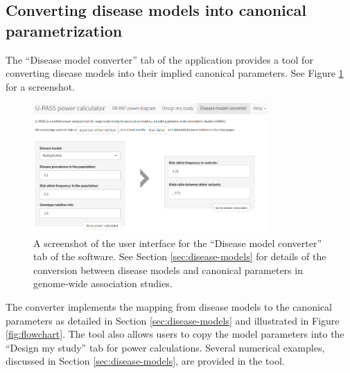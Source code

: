 \subsection{Converting disease models into canonical parametrization}

The ``Disease model converter'' tab of the application provides a tool for converting disease models into their implied canonical parameters.
See Figure \ref{fig:UPASS-model-converter} for a screenshot.

\begin{figure}
    \centering
    \includegraphics[width=0.8\textwidth]{figures/UPASS_model_converter.png}
    \caption{A screenshot of the user interface for the ``Disease model converter'' tab of the software. See Section \ref{sec:disease-models} for details of the conversion between disease models and canonical parameters in genome-wide association studies.}
    \label{fig:UPASS-model-converter}
\end{figure}

The converter implements the mapping from disease models to the canonical parameters as detailed in Section \ref{sec:disease-models} and  illustrated in Figure \ref{fig:flowchart}.
The tool also allows users to copy the model parameters into the ``Design my study'' tab for power calculations.
Several numerical examples, discussed in Section  \ref{sec:disease-models}, are provided in the tool. 

